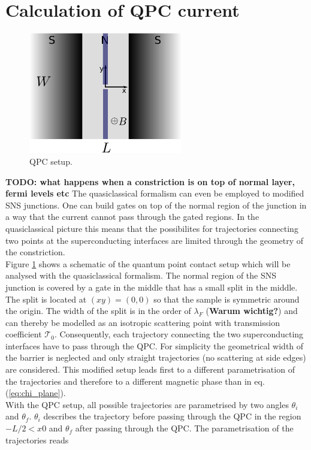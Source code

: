 \section{Calculation of QPC current}
\begin{figure}
\centering
\includegraphics[width=0.6\textwidth]{figure/analyticalmodel/qpc_sns_junction}
\caption{QPC setup.}
\label{fig:qpc_sns_schematic}
\end{figure}
\textbf{TODO: what happens when a constriction is on top of normal layer, fermi levels etc}
The quasiclassical formalism can even be employed to modified SNS junctions. One can build gates on top of the normal region of the junction in a way that the current cannot pass through the gated regions. In the quasiclassical picture this means that the possibilites for trajectories connecting two points at the superconducting interfaces are limited through the geometry of the constriction.\\
Figure \ref{fig:qpc_sns_schematic} shows a schematic of the quantum point contact setup which will be analysed with the quasiclassical formalism. The normal region of the SNS junction is covered by a gate in the middle that has a small split in the middle. The split is located at $(x y) = (0, 0)$ so that the sample is symmetric around the origin. The width of the split is in the order of $\lambda_F$ (\textbf{Warum wichtig?}) and can thereby be modelled as an isotropic scattering point with transmission coefficient $\mathcal{T}_0$. Consequently, each trajectory connecting the two superconducting interfaces have to pass through the QPC. For simplicity the geometrical width of the barrier is neglected and only straight trajectories (no scattering at side edges) are considered. This modified setup leads first to a different parametrisation of the trajectories and therefore to a different magnetic phase than in eq. (\ref{eq:chi_plane}).\\
With the QPC setup, all possible trajectories are parametrised by two angles $\theta_i$ and $\theta_f$. $\theta_i$ describes the trajectory before passing through the QPC in the region $ -L/2 < x 0$ and  $\theta_f$ after passing through the QPC. The parametrisation of the trajectories reads
